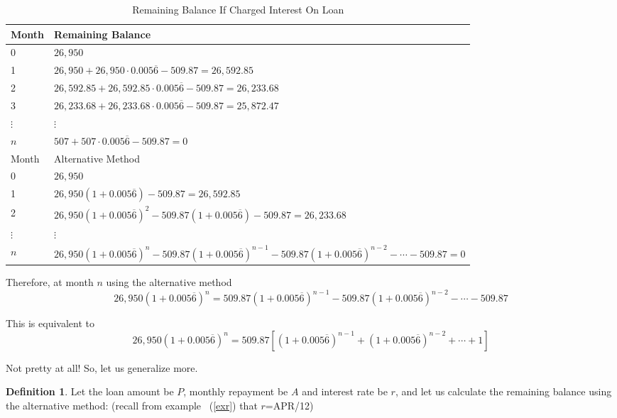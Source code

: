 \documentclass[12pt,letterpaper]{amsart}
\theoremstyle{definition} %
\newtheorem{definition}[theorem]{Definition} %
\begin{document}
\begin{table}[ht]\caption{Remaining Balance If Charged Interest On Loan}\begin{tabular}[center]{l|l}
\hline\hline
Month			&	Remaining Balance\\
\hline
0				&	$26,950$\\
1				&	$26,950+26,950\cdot 0.005\overline{6}-509.87=26,592.85$\\
2				&	$26,592.85+26,592.85\cdot 0.005\overline{6}-509.87=26,233.68$\\
3				&	$26,233.68+26,233.68\cdot 0.005\overline{6}-509.87=25,872.47$\\
$\vdots$	&	$\vdots$\\
$n$			&	$507+507\cdot 0.005\overline{6}-509.87=0$\\
\hline
Month			&	Alternative Method\\
\hline
0				&	$26,950$\\
1				&	$26,950(1+0.005\overline{6})-509.87=26,592.85$\\
2				&	$26,950(1+0.005\overline{6})^2-509.87(1+0.005\overline{6})-509.87=26,233.68$\\
$\vdots$	&	$\vdots$\\
$n$			&	\small $26,950(1+0.005\overline{6})^n-509.87(1+0.005\overline{6})^{n-1}-509.87(1+0.005\overline{6})^{n-2}-\cdots -509.87=0$\\ %
\hline\end{tabular}\end{table}

\par Therefore, at month $n$ using the alternative method
\small $$26,950(1+0.005\overline{6})^n=509.87(1+0.005\overline{6})^{n-1}-509.87(1+0.005\overline{6})^{n-2}-\cdots -509.87$$

\par \normalsize This is equivalent to $$26,950(1+0.005\overline{6})^n=509.87\left[(1+0.005\overline{6})^{n-1}+(1+0.005\overline{6})^{n-2}+\cdots +1\right]$$ %

\par Not pretty at all! So, let us generalize more.

\vfill
\pagebreak

\begin{definition}Let the loan amount be $P$, monthly repayment be $A$ and interest rate be $r$, and let us calculate the remaining balance using the alternative method: (recall from example ~(\ref{exr}) that $r$=APR/12)\end{definition}
\end{document}
